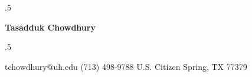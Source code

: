 \documentclass[margin,line,10pt]{res} %
\begin{document}
\pagestyle{fancy}



\moveleft.5\hoffset\centerline{\Large\bf Tasadduk Chowdhury} %
\vspace{8pt}



\moveleft.5\hoffset\centerline{
tchowdhury@uh.edu \hfill   \hfill 
(713) 498-9788 \hfill  \hfill 
U.S. Citizen \hfill  \hfill 
Spring, TX 77379}



\end{document}
